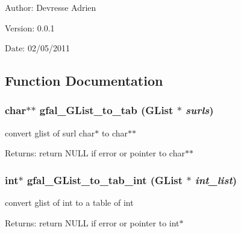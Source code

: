 \begin{Desc}
\item[Author:]Devresse Adrien \end{Desc}
\begin{Desc}
\item[Version:]0.0.1 \end{Desc}
\begin{Desc}
\item[Date:]02/05/2011 \end{Desc}


\subsection{Function Documentation}
\subsubsection{\setlength{\rightskip}{0pt plus 5cm}char$\ast$$\ast$ gfal\_\-GList\_\-to\_\-tab (GList $\ast$ {\em surls})}\label{gfal__common__all_8c_a7e1120eb32c4c7f293f6fbcb4f0ea33}


convert glist of surl char$\ast$ to char$\ast$$\ast$ 

\begin{Desc}
\item[Returns:]return NULL if error or pointer to char$\ast$$\ast$ \end{Desc}
\subsubsection{\setlength{\rightskip}{0pt plus 5cm}int$\ast$ gfal\_\-GList\_\-to\_\-tab\_\-int (GList $\ast$ {\em int\_\-list})}\label{gfal__common__all_8c_87219c9e2c6323b67c2ac70354ee2645}


convert glist of int to a table of int 

\begin{Desc}
\item[Returns:]return NULL if error or pointer to int$\ast$ \end{Desc}
